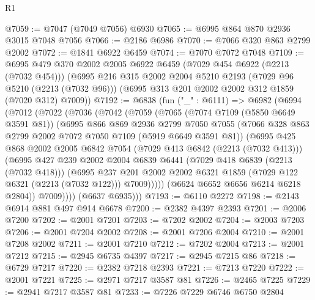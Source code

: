\begin{lexlean}{R1}
\begin{coremodule}
@7059 := @7047 (@7049 @7056) @6930
@7065 := @6995 @864 @870 @2936 @3015 @7048 @7056
@7066 := @2186 @6986
@7070 := @7066 @320 @863 @2799 @2002
@7072 := @1841 @6922 @6459
@7074 := @7070 @7072 @7048
@7109 := @6995
    @479
    @370
    @2002
    @2005
    @6922
    @6459
    (@7029 @454 @6922 (@2213 (@7032 @454)))
    (@6995
      @216
      @315
      @2002
      @2004
      @5210
      @2193
      (@7029 @96 @5210 (@2213 (@7032 @96)))
      (@6995 @313 @201 @2002 @2002 @312 @1859 (@7020 @312) @7009))
@7192 := @6838
    (fun ("_" : @6111) =>
    @6982
      (@6994
        (@7012
          (@7022
            (@7036
              (@7042
                (@7059
                  (@7065
                    (@7074 @7109 (@5850 @6649 @3591 @81))
                    (@6995
                      @866
                      @869
                      @2936
                      @2799
                      @7050
                      @7055
                      (@7066 @328 @863 @2799 @2002 @7072 @7050 @7109 (@5919 @6649 @3591 @81))
                      (@6995
                        @425
                        @868
                        @2002
                        @2005
                        @6842
                        @7054
                        (@7029 @413 @6842 (@2213 (@7032 @413)))
                        (@6995
                          @427
                          @239
                          @2002
                          @2004
                          @6839
                          @6441
                          (@7029 @418 @6839 (@2213 (@7032 @418)))
                          (@6995
                            @237
                            @201
                            @2002
                            @2002
                            @6321
                            @1859
                            (@7029 @122 @6321 (@2213 (@7032 @122)))
                            @7009)))))
                  (@6624 @6652 @6656 @6214 @6218 @2804))
                @7009))))
        (@6637 @6935)))
@7193 := @6110 @2272
@7198 := @2143 @6914 @881 @497 @914 @6678
@7200 := @2382 @4397 @2393
@7201 := @2006 @7200
@7202 := @2001 @7201
@7203 := @7202 @2002
@7204 := @2003 @7203
@7206 := @2001 @7204 @2002
@7208 := @2001 @7206 @2004
@7210 := @2001 @7208 @2002
@7211 := @2001 @7210
@7212 := @7202 @2004
@7213 := @2001 @7212
@7215 := @2945 @6735 @4397
@7217 := @2945 @7215 @86
@7218 := @6729 @7217
@7220 := @2382 @7218 @2393
@7221 := @7213 @7220
@7222 := @2001 @7221
@7225 := @2971 @7217 @3587 @81
@7226 := @2465 @7225
@7229 := @2941 @7217 @3587 @81
@7233 := @7226 @7229 @6746 @6750 @2804

\end{coremodule}
\end{lexlean}
